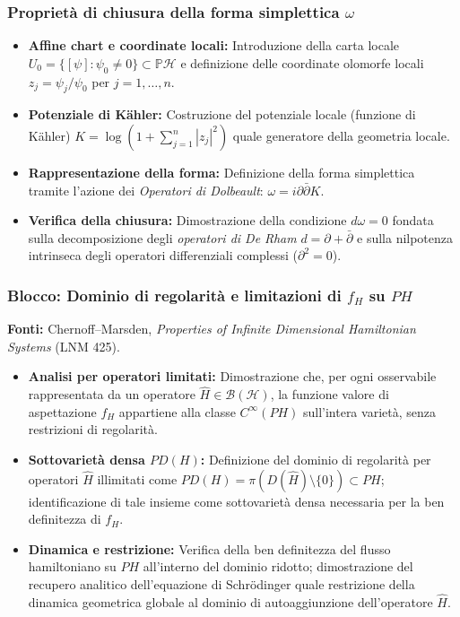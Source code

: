 \documentclass[12pt, a4paper]{article}
\newcommand{\fonti}[1]{%
	\begin{fontebox}
		\textcolor{fontecolor}{\footnotesize\textbf{Fonti:} #1}
	\end{fontebox}%
}
\begin{document}
	\subsubsection{Proprietà di chiusura della forma simplettica $\omega$}
	\begin{itemize}
		\item \textbf{Affine chart e coordinate locali:} Introduzione della carta locale $U_0 = \{[\psi] : \psi_0 \neq 0\} \subset \mathbb{P}\mathcal{H}$ e definizione delle coordinate olomorfe locali $z_j = \psi_j/\psi_0$ per $j=1, \dots, n$.
		\item \textbf{Potenziale di Kähler:} Costruzione del potenziale locale (funzione di K\"{a}hler) $K = \log(1 + \sum_{j=1}^n |z_j|^2)$ quale generatore della geometria locale.
		\item \textbf{Rappresentazione della forma:} Definizione della forma simplettica tramite l'azione dei \textit{Operatori di Dolbeault}: $\omega = i\partial\bar{\partial}K$.
		\item \textbf{Verifica della chiusura:} Dimostrazione della condizione $d\omega = 0$ fondata sulla decomposizione degli \textit{operatori di De Rham} $d = \partial + \bar{\partial}$ e sulla nilpotenza intrinseca degli operatori differenziali complessi ($\partial^2 = 0$).
	\end{itemize}
	
	\subsubsection{Blocco: Dominio di regolarità e limitazioni di $f_H$ su $PH$}
	
	\fonti{Chernoff--Marsden, \textit{Properties of Infinite Dimensional Hamiltonian Systems} (LNM 425).}
	
	\begin{itemize}
		\item \textbf{Analisi per operatori limitati:} Dimostrazione che, per ogni osservabile rappresentata da un operatore $\hat{H} \in \mathcal{B}(\mathcal{H})$, la funzione valore di aspettazione $f_H$ appartiene alla classe $C^\infty(PH)$ sull'intera varietà, senza restrizioni di regolarità.
		\item \textbf{Sottovarietà densa $PD(H)$:} Definizione del dominio di regolarità per operatori $\hat{H}$ illimitati come $PD(H) = \pi(D(\hat{H}) \setminus \{0\}) \subset PH$; identificazione di tale insieme come sottovarietà densa necessaria per la ben definitezza di $f_H$.
		\item \textbf{Dinamica e restrizione:} Verifica della ben definitezza del flusso hamiltoniano su $PH$ all'interno del dominio ridotto; dimostrazione del recupero analitico dell'equazione di Schrödinger quale restrizione della dinamica geometrica globale al dominio di autoaggiunzione dell'operatore $\hat{H}$.
	\end{itemize}
	
\end{document}
